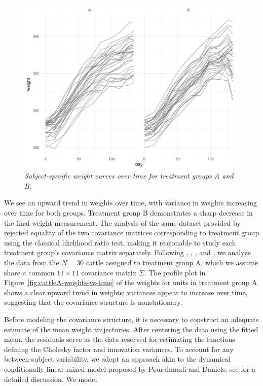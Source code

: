 \begin{figure}[h] 
\begin{center}
\includegraphics[width = \textwidth]{img/cattle/cattle-weights-vs-time-by-trt}
\caption{\textit{Subject-specific weight curves over time for treatment groups A and B.}}\label{fig:cattle-weights-by-trt}
\end{center}
\end{figure} 

We see an upward trend in weights over time, with variance in weights increasing over time for both groups. Treatment group B demonstrates a sharp decrease in the final weight measurement. The analysis of the same dataset provided by \cite{zimmerman1997structured} rejected equality of the two covariance matrices corresponding to treatment group using the classical likelihood ratio test, making it reasonable to study each treatment group's covariance matrix separately. Following \cite{pan2017jmcm}, \cite{zhang2015joint}, \cite{pourahmadi1999joint}, and \cite{pan2006regression}, we analyze the data from the $N = 30$ cattle assigned to treatment group A, which we assume share a common $11 \times 11$ covariance matrix $\Sigma$. The profile plot in Figure~\ref{fig:cattleA-weights-vs-time} of the weights for units in treatment group A shows a clear upward trend in weights;  variances appear to increase over time, suggesting that the covariance structure is nonstationary.

\bigskip

Before modeling the covariance structure, it is necessary to construct an adequate estimate of the mean weight trajectories. After centering the data using the fitted mean, the residuals serve as the data reserved for estimating the functions defining the Cholesky factor and innovation variances.  To account for any between-subject variability, we adopt an approach akin to the dynamical conditionally linear mixed model proposed by Pourahmadi and Daniels; see \cite{pourahmadi2002dynamic} for a detailed discussion. We model

